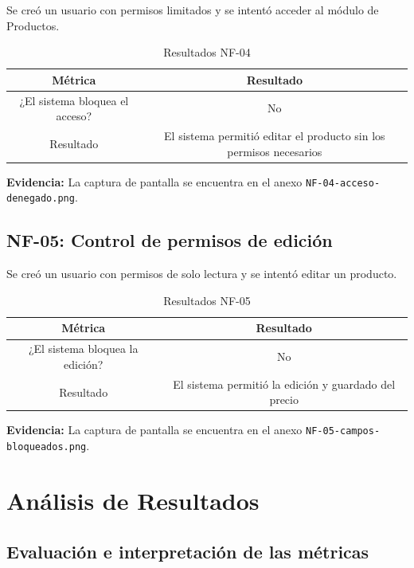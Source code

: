 \documentclass[12pt, letterpaper]{article}
\begin{document}
Se creó un usuario con permisos limitados y se intentó acceder al módulo de Productos.

\begin{table}[H]
\centering
\caption{Resultados NF-04}
\begin{tabular}{|c|c|}
\hline
\textbf{Métrica} & \textbf{Resultado} \\
\hline
¿El sistema bloquea el acceso? & No \\
\hline
Resultado & El sistema permitió editar el producto sin los permisos necesarios \\
\hline
\end{tabular}
\end{table}

\textbf{Evidencia:} La captura de pantalla se encuentra en el anexo \texttt{NF-04-acceso-denegado.png}.

\subsection{NF-05: Control de permisos de edición}

Se creó un usuario con permisos de solo lectura y se intentó editar un producto.

\begin{table}[H]
\centering
\caption{Resultados NF-05}
\begin{tabular}{|c|c|}
\hline
\textbf{Métrica} & \textbf{Resultado} \\
\hline
¿El sistema bloquea la edición? & No \\
\hline
Resultado & El sistema permitió la edición y guardado del precio \\
\hline
\end{tabular}
\end{table}

\textbf{Evidencia:} La captura de pantalla se encuentra en el anexo \texttt{NF-05-campos-bloqueados.png}.

\newpage

\section{Análisis de Resultados}

\subsection{Evaluación e interpretación de las métricas}
\end{document}
